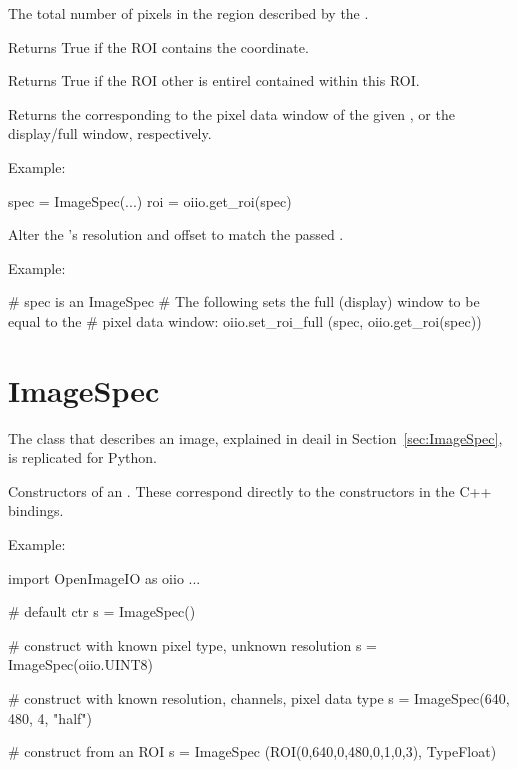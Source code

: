 The total number of pixels in the region described by the \ROI.
\apiend

Returns {\cf True} if the ROI contains the coordinate.
\apiend

Returns {\cf True} if the ROI {\cf other} is entirel contained within
this ROI.
\apiend


Returns the \ROI corresponding to the pixel data window of the given
\ImageSpec, or the display/full window, respectively.

\noindent Example:
\begin{code}
    spec = ImageSpec(...)
    roi = oiio.get_roi(spec)
\end{code}
\apiend

Alter the \ImageSpec's resolution and offset to match the passed \ROI.

\noindent Example:
\begin{code}
    # spec is an ImageSpec
    # The following sets the full (display) window to be equal to the
    # pixel data window:
    oiio.set_roi_full (spec, oiio.get_roi(spec))
\end{code}
\apiend


\section{ImageSpec}
\label{sec:pythonimagespec}

The \ImageSpec class that describes an image, explained in deail in
Section~\ref{sec:ImageSpec}, is replicated for Python.

Constructors of an \ImageSpec. These correspond directly to the constructors
in the C++ bindings.

\noindent Example:
\begin{code}
    import OpenImageIO as oiio
    ...

    # default ctr
    s = ImageSpec()

    # construct with known pixel type, unknown resolution
    s = ImageSpec(oiio.UINT8)

    # construct with known resolution, channels, pixel data type
    s = ImageSpec(640, 480, 4, "half")

    # construct from an ROI
    s = ImageSpec (ROI(0,640,0,480,0,1,0,3), TypeFloat)
\end{code}
\apiend


